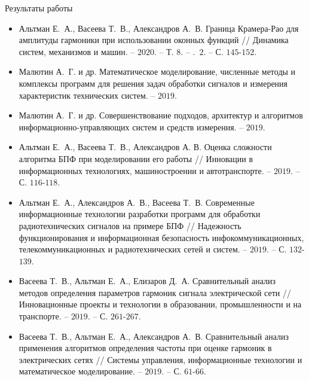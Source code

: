 \begin{frame}{Результаты работы}
\scriptsize{
\begin{itemize}
	\item Альтман Е.~А., Васеева Т.~В., Александров А.~В. Граница Крамера-Рао для амплитуды гармоники при использовании оконных функций // Динамика систем, механизмов и машин. – $2020$. – Т. $8$. – \textnumero.~$2$. – С. $145$-$152$.
	
	\item Малютин А.~Г. и др. Математическое моделирование, численные методы и комплексы программ для решения задач обработки сигналов и измерения характеристик технических систем. – $2019$.
	
	\item  Малютин А.~Г. и др. Совершенствование подходов, архитектур и алгоритмов информационно-управляющих систем и средств измерения. – $2019$.
		
	\item Альтман Е.~А., Васеева Т.~В., Александров А. В. Оценка сложности алгоритма БПФ при моделировании его работы // Инновации в информационных технологиях, машиностроении и автотранспорте. – $2019$. – С. $116$-$118$.
	
	\item Альтман Е.~А., Александров А.~В., Васеева Т.~В. Современные информационные технологии разработки программ для обработки радиотехнических сигналов на примере БПФ // Надежность функционирования и информационная безопасность инфокоммуникационных, телекоммуникационных и радиотехнических сетей и систем. – $2019$. – С. $132$-$139$.
	
	\item Васеева Т.~В., Альтман Е.~А., Елизаров Д.~А. Сравнительный анализ методов определения параметров гармоник сигнала электрической сети // Инновационные проекты и технологии в образовании, промышленности и на транспорте. – $2019$. – С. $261$-$267$.

	\item Васеева Т.~В., Альтман Е.~А., Александров А.~В. Сравнительный анализ применения алгоритмов определения частоты при оценке гармоник в электрических сетях // Системы управления, информационные технологии и математическое моделирование. – $2019$. – С. $61$-$66$.
\end{itemize}}
\end{frame}

